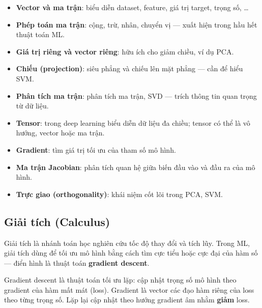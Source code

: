 \begin{phuongphap}[title={Các khái niệm đại số tuyến tính quan trọng trong ML}]
\begin{itemize}
  \item \textbf{Vector và ma trận}: biểu diễn dataset, feature, giá trị target, trọng số, \ldots
  \item \textbf{Phép toán ma trận}: cộng, trừ, nhân, chuyển vị --- xuất hiện trong hầu hết thuật toán ML.
  \item \textbf{Giá trị riêng và vector riêng}: hữu ích cho giảm chiều, ví dụ PCA.
  \item \textbf{Chiếu (projection)}: siêu phẳng và chiếu lên mặt phẳng --- cần để hiểu SVM.
  \item \textbf{Phân tích ma trận}: phân tích ma trận, SVD --- trích thông tin quan trọng từ dữ liệu.
  \item \textbf{Tensor}: trong deep learning biểu diễn dữ liệu đa chiều; tensor có thể là vô hướng, vector hoặc ma trận.
  \item \textbf{Gradient}: tìm giá trị tối ưu của tham số mô hình.
  \item \textbf{Ma trận Jacobian}: phân tích quan hệ giữa biến đầu vào và đầu ra của mô hình.
  \item \textbf{Trực giao (orthogonality)}: khái niệm cốt lõi trong PCA, SVM.
\end{itemize}
\end{phuongphap}

\subsection{Giải tích (Calculus)}

\begin{dinhnghia}[title={Giải tích}]
Giải tích là nhánh toán học nghiên cứu tốc độ thay đổi và tích lũy.
Trong ML, giải tích dùng để tối ưu mô hình bằng cách tìm cực tiểu hoặc cực đại của hàm số --- điển hình là thuật toán \textbf{gradient descent}.
\end{dinhnghia}

\begin{phuongphap}[title={Gradient descent (tóm tắt)}]
Gradient descent là thuật toán tối ưu lặp: cập nhật trọng số mô hình theo gradient của hàm mất mát (loss).
Gradient là vector các đạo hàm riêng của loss theo từng trọng số.
Lặp lại cập nhật theo hướng gradient âm nhằm \textbf{giảm} loss.
\end{phuongphap}

